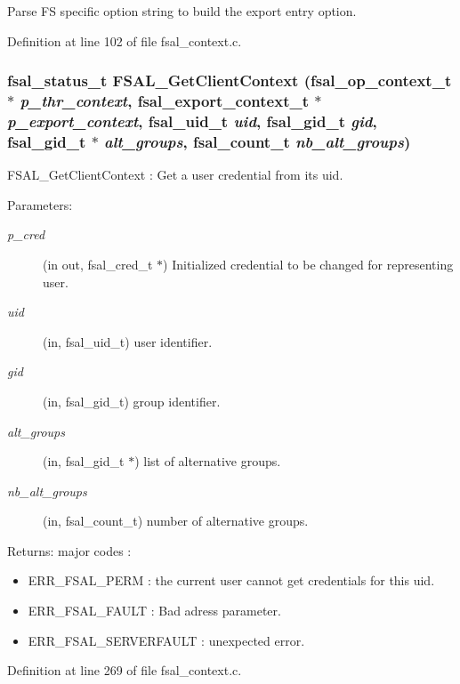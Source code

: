 Parse FS specific option string to build the export entry option. 

Definition at line 102 of file fsal\_\-context.c.
\subsubsection{\setlength{\rightskip}{0pt plus 5cm}fsal\_\-status\_\-t FSAL\_\-Get\-Client\-Context (fsal\_\-op\_\-context\_\-t $\ast$ {\em p\_\-thr\_\-context}, fsal\_\-export\_\-context\_\-t $\ast$ {\em p\_\-export\_\-context}, fsal\_\-uid\_\-t {\em uid}, fsal\_\-gid\_\-t {\em gid}, fsal\_\-gid\_\-t $\ast$ {\em alt\_\-groups}, fsal\_\-count\_\-t {\em nb\_\-alt\_\-groups})}\label{group__FSALCredFunctions_ga2}


FSAL\_\-Get\-Client\-Context : Get a user credential from its uid.

\begin{Desc}
\item[Parameters:]
\begin{description}
\item[{\em p\_\-cred}](in out, fsal\_\-cred\_\-t $\ast$) Initialized credential to be changed for representing user. \item[{\em uid}](in, fsal\_\-uid\_\-t) user identifier. \item[{\em gid}](in, fsal\_\-gid\_\-t) group identifier. \item[{\em alt\_\-groups}](in, fsal\_\-gid\_\-t $\ast$) list of alternative groups. \item[{\em nb\_\-alt\_\-groups}](in, fsal\_\-count\_\-t) number of alternative groups.\end{description}
\end{Desc}
\begin{Desc}
\item[Returns:]major codes :\begin{itemize}
\item ERR\_\-FSAL\_\-PERM : the current user cannot get credentials for this uid.\item ERR\_\-FSAL\_\-FAULT : Bad adress parameter.\item ERR\_\-FSAL\_\-SERVERFAULT : unexpected error. \end{itemize}
\end{Desc}


Definition at line 269 of file fsal\_\-context.c.